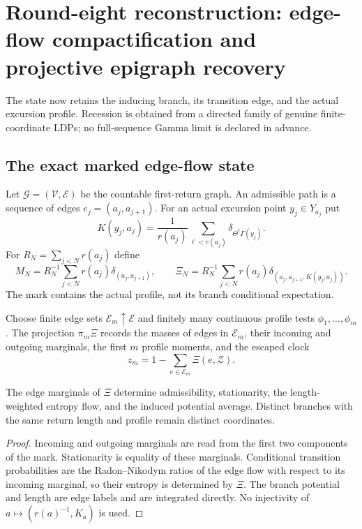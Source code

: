 \section{Round-eight reconstruction: edge-flow compactification and projective epigraph recovery}
\label{sec:r8-a3}

The state now retains the inducing branch, its transition edge, and the actual
excursion profile.  Recession is obtained from a directed family of genuine
finite-coordinate LDPs; no full-sequence Gamma limit is declared in advance.

\subsection{The exact marked edge-flow state}

Let $\mathcal G=(\mathcal V,\mathcal E)$ be the countable first-return graph.
An admissible path is a sequence of edges $e_j=(a_j,a_{j+1})$.  For an actual
excursion point $y_j\in Y_{a_j}$ put
\[
 K(y_j,a_j)=\frac1{r(a_j)}\sum_{\ell<r(a_j)}
 \delta_{\Theta^\ell\Gamma(y_j)}.
\]
For $R_N=\sum_{j<N}r(a_j)$ define
\[
 M_N=R_N^{-1}\sum_{j<N}r(a_j)\delta_{(a_j,a_{j+1})},
\qquad
 \Xi_N=R_N^{-1}\sum_{j<N}r(a_j)
 \delta_{(a_j,a_{j+1},K(y_j,a_j))}.
\]
The mark contains the actual profile, not its branch conditional expectation.

Choose finite edge sets $\mathcal E_m\uparrow\mathcal E$ and finitely many
continuous profile tests $\phi_1,\ldots,\phi_m$.  The projection $\pi_m\Xi$
records the masses of edges in $\mathcal E_m$, their incoming and outgoing
marginals, the first $m$ profile moments, and the escaped clock
\[
 z_m=1-\sum_{e\in\mathcal E_m}\Xi(e,\mathcal Z).
\]

\begin{lemma}
\label{lem:r8-a3-state}
The edge marginals of $\Xi$ determine admissibility, stationarity, the
length-weighted entropy flow, and the induced potential average.  Distinct
branches with the same return length and profile remain distinct coordinates.
\end{lemma}

\begin{proof}
Incoming and outgoing marginals are read from the first two components of the
mark.  Stationarity is equality of these marginals.  Conditional transition
probabilities are the Radon--Nikodym ratios of the edge flow with respect to its
incoming marginal, so their entropy is determined by $\Xi$.  The branch
potential and length are edge labels and are integrated directly.  No
injectivity of $a\mapsto(r(a)^{-1},K_a)$ is used.
\end{proof}

